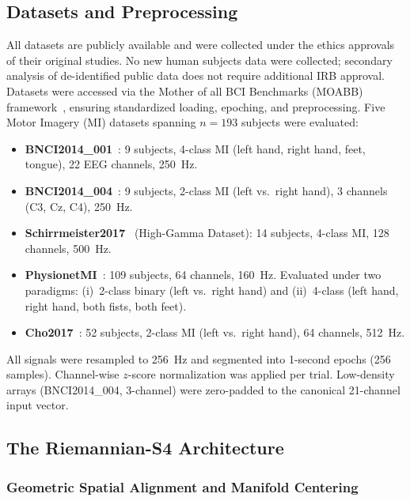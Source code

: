 \documentclass[11pt,a4paper]{article}
\begin{document}
\subsection{Datasets and Preprocessing}

All datasets are publicly available and were collected under the ethics
approvals of their original studies.
No new human subjects data were collected; secondary analysis of de-identified
public data does not require additional IRB approval.
Datasets were accessed via the Mother of all BCI Benchmarks (MOABB)
framework~\cite{Jayaram2018}, ensuring standardized loading, epoching, and
preprocessing.
Five Motor Imagery (MI) datasets spanning $n = 193$ subjects were evaluated:

\begin{itemize}
    \item \textbf{BNCI2014\_001}~\cite{Brunner2008}: 9 subjects,
          4-class MI (left hand, right hand, feet, tongue),
          22 EEG channels, 250~Hz.
    \item \textbf{BNCI2014\_004}~\cite{Leeb2008}: 9 subjects,
          2-class MI (left vs.\ right hand), 3 channels (C3, Cz, C4), 250~Hz.
    \item \textbf{Schirrmeister2017}~\cite{Schirrmeister2017} (High-Gamma
          Dataset): 14 subjects, 4-class MI, 128 channels, 500~Hz.
    \item \textbf{PhysionetMI}~\cite{Goldberger2000,Schalk2004}: 109 subjects,
          64 channels, 160~Hz.
          Evaluated under two paradigms: (i)~2-class binary (left vs.\ right
          hand) and (ii)~4-class (left hand, right hand, both fists, both feet).
    \item \textbf{Cho2017}~\cite{Cho2017}: 52 subjects, 2-class MI
          (left vs.\ right hand), 64 channels, 512~Hz.
\end{itemize}

All signals were resampled to 256~Hz and segmented into 1-second epochs
(256 samples).
Channel-wise $z$-score normalization was applied per trial.
Low-density arrays (BNCI2014\_004, 3-channel) were zero-padded to the
canonical 21-channel input vector.

\subsection{The Riemannian-S4 Architecture}

\subsubsection{Geometric Spatial Alignment and Manifold Centering}
\end{document}
